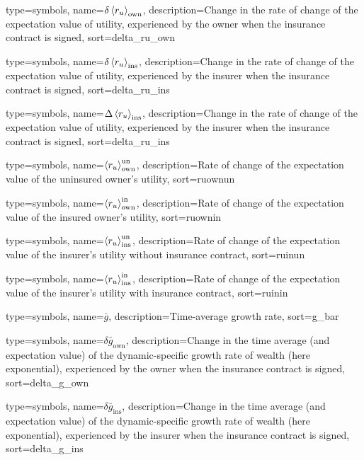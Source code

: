 {
 type={symbols}, 
 name={\ensuremath{\delta \ave{r_u}_{\text{own}}}},
 description={Change in the rate of change of the expectation value of utility, experienced by the owner when the insurance contract is signed},
 sort=delta_ru_own
}

{
 type={symbols}, 
 name={\ensuremath{\delta \ave{r_u}_{\text{ins}}}},
 description={Change in the rate of change of the expectation value of utility, experienced by the insurer when the insurance contract is signed},
 sort=delta_ru_ins
}

{
 type={symbols}, 
 name={\ensuremath{\Delta \ave{r_u}_{\text{ins}}}},
 description={Change in the rate of change of the expectation value of utility, experienced by the insurer when the insurance contract is signed},
 sort=delta_ru_ins
}

{
  type={symbols}, 
  name={\ensuremath{\ave{r_u}_{\text{own}}^{\text{un}}}},
  description={Rate of change of the expectation value of the uninsured owner's utility},
  sort=ruownun
}

{
  type={symbols}, 
  name={\ensuremath{\ave{r_u}_{\text{own}}^{\text{in}}}},
  description={Rate of change of the expectation value of the insured owner's utility},
  sort=ruownin
}


{
  type={symbols}, 
  name={\ensuremath{\ave{r_u}_{\text{ins}}^{\text{un}}}},
  description={Rate of change of the expectation value of the insurer's utility without insurance contract},
  sort=ruinun
}

{
  type={symbols}, 
  name={\ensuremath{\ave{r_u}_{\text{ins}}^{\text{in}}}},
  description={Rate of change of the expectation value of the insurer's utility with insurance contract},
  sort=ruinin
}



{
  type={symbols}, 
  name={\ensuremath{\bar{g}}},
  description={Time-average growth rate},
  sort=g_bar
}


{
 type={symbols}, 
 name={\ensuremath{\delta \bar{g}_{\text{own}}}},
 description={Change in the time average (and expectation value) of the dynamic-specific growth rate of wealth (here exponential), experienced by the owner when the insurance contract is signed},
 sort=delta_g_own
}

{
 type={symbols}, 
 name={\ensuremath{\delta \bar{g}_{\text{ins}}}},
 description={Change in the time average (and expectation value) of the dynamic-specific growth rate of wealth (here exponential), experienced by the insurer when the insurance contract is signed},
 sort=delta_g_ins
}

